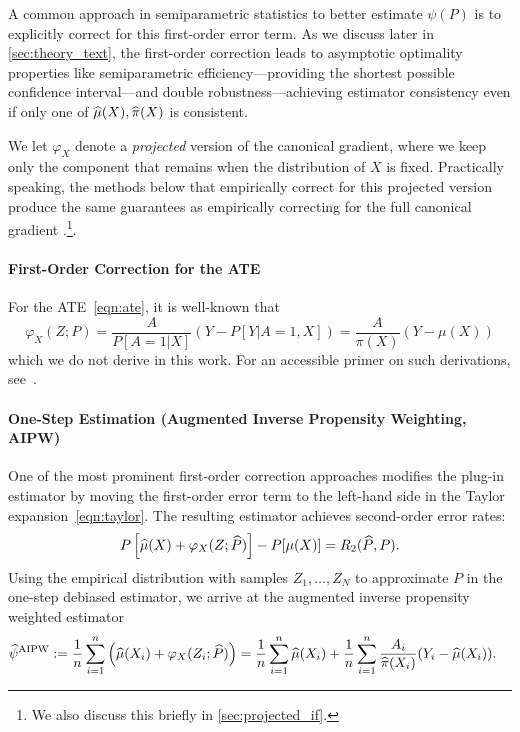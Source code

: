 A common approach in semiparametric statistics to better estimate $\psi(P)$ is to explicitly correct for this first-order error term. 
As we discuss later in \cref{sec:theory_text}, the first-order correction leads to asymptotic optimality properties like semiparametric efficiency---providing the shortest possible confidence interval---and double robustness---achieving estimator consistency even if only one of $\widehat{\mu}(X), \widehat{\pi}(X)$ is consistent. 

We let $\varphi_X$ denote a \emph{projected} version of the canonical gradient, 
where we keep only the component that remains when the distribution of $X$ is fixed. Practically speaking, the methods below that empirically correct for this projected version produce the same guarantees as empirically correcting for the full canonical gradient \cite{VanDerLaanRo11,van2006targeted}.\ifdefined\msom\else\ifdefined\pnas{}\footnote{We also discuss this briefly in \cref{sec:projected_if}.}. 
\else\fi\fi
\paragraph{First-Order Correction for the ATE} For the ATE~\eqref{eqn:ate}, it is well-known that 
\begin{equation}
\label{eqn:ate-pathwise}
\varphi_X(Z; P)
= \frac{A}{P[A =1 | X]} (Y - P[Y | A = 1, X])
= \frac{A}{\pi(X)} (Y - \mu(X))
\end{equation}
which we do not derive in this work. %
For an accessible primer on such derivations, see~\citep{Kennedy22}. 

\paragraph{One-Step Estimation (Augmented Inverse Propensity Weighting, AIPW)~\cite{Bang2005DoublyRE}} 
One of the most prominent first-order correction approaches modifies the plug-in estimator by moving the first-order error term to the left-hand side in the Taylor expansion~\eqref{eqn:taylor}. The resulting estimator achieves second-order error rates:
\vspace{-0.3em}
\begin{align*}
    P\left[ \widehat{\mu}(X)
    + \varphi_X(Z; \widehat{P})\right]
    - P[\mu(X)] = R_2(\widehat{P}, P).
\end{align*}
Using the empirical distribution with samples $Z_1,\ldots,Z_N$ to approximate $P$ in 
the one-step debiased estimator, we arrive at the augmented inverse propensity weighted estimator
\begin{align}
    \what\psi^{\textrm{\rm AIPW}} 
     & := \frac{1}{n} \sum_{i=1}^n 
    \left(\what{\mu}(X_i)
    + \varphi_X(Z_i; \what{P}) \right) %
     = \frac{1}{n} \sum_{i=1}^n 
    \what{\mu}(X_i)
    + \frac{1}{n} \sum_{i=1}^n \frac{A_i}{\what{\pi}(X_i)} 
    (Y_i - \what{\mu}(X_i)) .
        \label{eqn:debiased}
\end{align}

